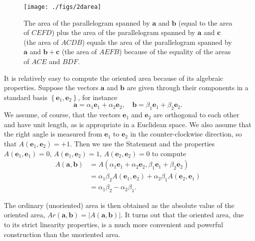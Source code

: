%
\begin{figure}
\begin{centering}
         \texttt{[image: ./figs/2darea]}
\par\end{centering}

\caption{The area of the parallelogram spanned by $\mathbf{a}$ and $\mathbf{b}$
(equal to the area of $CEFD$) plus the area of the parallelogram
spanned by $\mathbf{a}$ and $\mathbf{c}$ (the area of $ACDB$) equals
the area of the parallelogram spanned by $\mathbf{a}$ and $\mathbf{b}+\mathbf{c}$
(the area of $AEFB$) because of the equality of the areas of $ACE$
and $BDF$.\label{fig:The-area-of2}}

\end{figure}


It is relatively easy to compute the oriented area because of its
algebraic properties. Suppose the vectors $\mathbf{a}$ and $\mathbf{b}$
are given through their components in a standard basis $\left\{ \mathbf{e}_{1},\mathbf{e}_{2}\right\} $,
for instance \[
\mathbf{a}=\alpha_{1}\mathbf{e}_{1}+\alpha_{2}\mathbf{e}_{2},\quad\mathbf{b}=\beta_{1}\mathbf{e}_{1}+\beta_{2}\mathbf{e}_{2}.\]
We assume, of course, that the vectors $\mathbf{e}_{1}$ and $\mathbf{e}_{2}$
are orthogonal to each other and have unit length, as is appropriate
in a Euclidean space. We also assume that the right angle is measured
from $\mathbf{e}_{1}$ to $\mathbf{e}_{2}$ in the counter-clockwise
direction, so that $A(\mathbf{e}_{1},\mathbf{e}_{2})=+1$. Then we
use the Statement and the properties $A(\mathbf{e}_{1},\mathbf{e}_{1})=0$,
$A(\mathbf{e}_{1},\mathbf{e}_{2})=1$, $A(\mathbf{e}_{2},\mathbf{e}_{2})=0$
to compute\begin{align*}
A(\mathbf{a},\mathbf{b}) & =A(\alpha_{1}\mathbf{e}_{1}+\alpha_{2}\mathbf{e}_{2},\beta_{1}\mathbf{e}_{1}+\beta_{2}\mathbf{e}_{2})\\
 & =\alpha_{1}\beta_{2}A(\mathbf{e}_{1},\mathbf{e}_{2})+\alpha_{2}\beta_{1}A(\mathbf{e}_{2},\mathbf{e}_{1})\\
 & =\alpha_{1}\beta_{2}-\alpha_{2}\beta_{1}.\end{align*}


The ordinary (unoriented) area is then obtained as the absolute value
of the oriented area, $Ar(\mathbf{a},\mathbf{b})=\left|A(\mathbf{a},\mathbf{b})\right|$.
It turns out that the oriented area, due to its strict linearity properties,
is a much more convenient and powerful construction than the unoriented
area.


